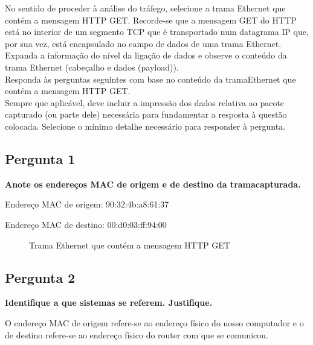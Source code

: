 \documentclass[11pt]{article}
\begin{document}
No sentido de proceder à análise do tráfego, selecione a trama Ethernet que contém a mensagem HTTP GET. Recorde-se que a mensagem GET do HTTP está no interior de um segmento TCP que é transportado num datagrama IP que, por sua vez, está encapsulado no campo de dados de uma trama Ethernet. Expanda a informação do nível da ligação de dados e observe o conteúdo da trama Ethernet (cabeçalho e dados (payload)).\\

Responda às perguntas seguintes com base no conteúdo da tramaEthernet que contém a mensagem HTTP GET.\\

Sempre que aplicável, deve incluir a impressão dos dados relativa ao pacote capturado (ou parte dele) necessária para fundamentar a resposta à questão colocada. Selecione o mínimo detalhe necessário para responder à pergunta.

\vspace{0.5cm}

\subsection{Pergunta 1}

\textbf{Anote os endereços MAC de origem e de destino da tramacapturada.}

Endereço MAC de origem:  90:32:4b:a8:61:37

Endereço MAC de destino:  00:d0:03:ff:94:00

\begin{figure}[hbt!]
    \centering
    \caption{Trama Ethernet que contém a mensagem HTTP GET}
\end{figure}
\clearpage

\subsection{Pergunta 2}

\textbf{Identifique a que sistemas se referem. Justifique.}

O endereço MAC de origem refere-se ao endereço físico do nosso computador e o de destino refere-se ao endereço físico do router com que se comunicou.
\end{document}
